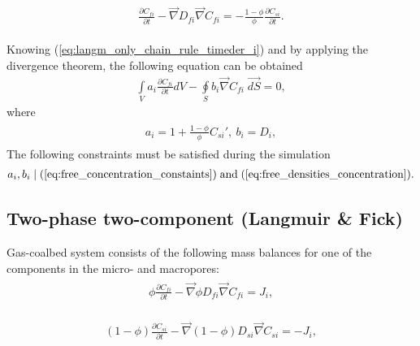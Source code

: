 \documentclass[a4paper,14pt,english]{extreport}
\begin{document}
\begin{eqnarray}
\begin{gathered}
\label{eq:langm_only_adsorbed_diffusivity_differential}
\frac{\partial C_{fi}}{\partial t} - \vec{\nabla} D_{fi} \vec{\nabla}C_{fi} = - \frac{\mathit{1} - \phi}{\phi} \frac{\partial C_{si}}{\partial t}.
\end{gathered}
\end{eqnarray}

Knowing (\ref{eq:langm_only_chain_rule_timeder_i}) and by applying the divergence theorem, the following equation can be obtained
\begin{eqnarray}
\label{eq:langm_only_diffusivity_simplified_integral}
\int \limits_{V} a_{i} \frac{\partial C_{fi}}{\partial t} dV - \oint \limits_{S} b_{i} \vec{\nabla}C_{fi} \; \vec{dS} = \mathit{0},
\end{eqnarray}
where
\begin{eqnarray}
\begin{gathered}
\label{eq:langm_only_diffusivity_a_b_coeffs}
a_{i}  =  \mathit{1}+\frac{\mathit{1} - \phi}{\phi}C_{si}', \: b_{i}  = D_{i},
\end{gathered}
\end{eqnarray}
The following constraints must be satisfied during the simulation
\begin{eqnarray}
\label{eq:a_b_langm_only_concentration_constaints}
a_{i}, b_{i} \mid (\ref{eq:free_concentration_constaints}) \; \text{and} \; (\ref{eq:free_densities_concentration}).
\end{eqnarray}

\subsection*{Two-phase two-component (Langmuir \& Fick)}
Gas-coalbed system consists of the following mass balances for one of the components in the micro- and macropores:
\begin{eqnarray}
\begin{gathered}
\label{eq:multiphase_free_diffusivity_differential}
\phi \frac{\partial C_{fi}}{\partial t}  - \vec{\nabla} \phi D_{fi} \vec{\nabla}C_{fi} = J_i,
\end{gathered}
\end{eqnarray}

\begin{eqnarray}
\begin{gathered}
\label{eq:multiphase_adsorbed_diffusivity_differential}
\left(\mathit{1}-\phi\right) \frac{\partial C_{si}}{\partial t}  - \vec{\nabla} \left(\mathit{1}-\phi\right) D_{si} \vec{\nabla}C_{si} = -J_i,
\end{gathered}
\end{eqnarray}
\end{document}
